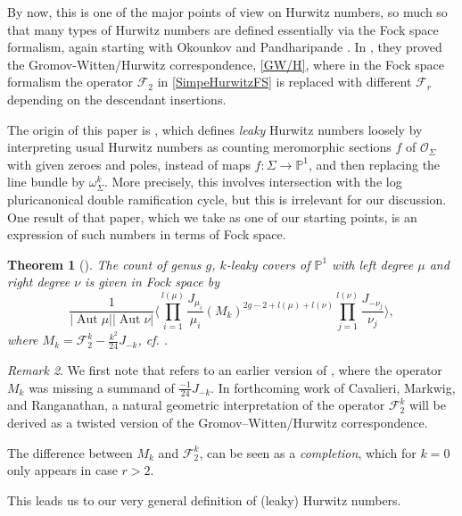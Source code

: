 \documentclass[10pt,a4paper,oneside,no-math,reqno]{amsart}%
\theoremstyle{plain}
\newtheorem{theorem}{Theorem}[section]
\theoremstyle{definition}
\theoremstyle{remark}
\newtheorem{remark}[theorem]{Remark}
\numberwithin{equation}{section}
\newcommand{\mb}[1]{\mathbb{#1}}
\newcommand{\mc}[1]{\mathcal{#1}}
\newcommand{\1}{\mathds{1}}
\renewcommand{\P}{\mb{P}}
\newcommand{\<}{\langle}
\renewcommand{\>}{\rangle}
\DeclareMathOperator{\Aut}{Aut}
\begin{document}
By now, this is one of the major points of view on Hurwitz numbers, so much so that many types of Hurwitz numbers are defined essentially via the Fock space formalism, again starting with Okounkov and Pandharipande \cite{OP06a}. In  \cite{OP06}, they proved the Gromov-Witten/Hurwitz correspondence, \cref{GW/H}, where in the Fock space formalism the operator $ \mc{F}_2$ in \cref{SimpeHurwitzFS} is replaced with different $ \mc{F}_r$ depending on the descendant insertions.


The origin of this paper is \cite{CMR25}, which defines \emph{leaky} Hurwitz numbers loosely by interpreting usual Hurwitz numbers as counting meromorphic sections $ f $ of $ \mc{O}_{\Sigma} $ with given zeroes and poles, instead of maps $ f \colon \Sigma \to \P^1$, and then replacing the line bundle by $ \omega_{\Sigma}^k $. More precisely, this involves intersection with the log pluricanonical double ramification cycle, but this is irrelevant for our discussion. One result of that paper, which we take as one of our starting points, is an expression of such numbers in terms of Fock space.


\begin{theorem}[{\cite[Theorem 5.2.2]{CMR25}}]\label{CMRFockSpace}
    The count of genus $g$, $k$-leaky covers of $ \P^1$ with left degree $ \mu$ and right degree $ \nu$ is given in Fock space by
    \begin{equation}
        \frac{1}{| \Aut \mu| | \Aut \nu| } \Big\< \prod_{i = 1}^{l (\mu)} \frac{J_{\mu_i}}{\mu_i} (M_k)^{2g-2+l(\mu) + l(\nu)} \prod_{j = 1}^{l(\nu)} \frac{J_{-\nu_j}}{\nu_j} \Big\>,
    \end{equation}
    where $ M_k = \mc{F}_2^k - \frac{k^2}{24} J_{-k}$, cf. \cite[Section 4]{AKL25}.
\end{theorem}

\begin{remark}
	We first note that  \cite[Section 4]{AKL25} refers to an earlier version of \cite{CMR25}, where the operator $M_k$ was missing a summand of $\frac{-1}{24}J_{-k}$. In forthcoming work of Cavalieri, Markwig, and Ranganathan, a natural geometric interpretation of the operator $\mc{F}_2^k$ will be derived as a twisted version of the Gromov--Witten/Hurwitz correspondence.
\end{remark}

The difference between $ M_k $ and $ \mc{F}_2^k$, can be seen as a \emph{completion}, which for $ k =0$ only appears in case $ r > 2$.

This leads us to our very general definition of (leaky) Hurwitz numbers.
\end{document}
